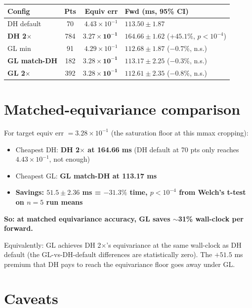 \documentclass[10pt,a4paper]{article}
\begin{document}
\begin{center}
\small
\begin{tabular}{lcrl}
\toprule
Config & Pts & Equiv err & Fwd (ms, 95\% CI) \\
\midrule
DH default                   & 70  & $4.43\!\times\!10^{-1}$ & $113.50 \pm 1.87$ \\
\textbf{DH 2$\times$}        & 784 & $\mathbf{3.27\!\times\!10^{-1}}$ & $\mathbf{164.66 \pm 1.62}$ ($+45.1\%$, $p<10^{-4}$) \\
GL min                       & 91  & $4.29\!\times\!10^{-1}$ & $112.68 \pm 1.87$ ($-0.7\%$, n.s.) \\
\textbf{GL match-DH}         & 182 & $\mathbf{3.28\!\times\!10^{-1}}$ & $\mathbf{113.17 \pm 2.25}$ ($-0.3\%$, n.s.) \\
\textbf{GL 2$\times$}        & 392 & $\mathbf{3.28\!\times\!10^{-1}}$ & $\mathbf{112.61 \pm 2.35}$ ($-0.8\%$, n.s.) \\
\bottomrule
\end{tabular}
\end{center}

\section*{Matched-equivariance comparison}

For target equiv err $= 3.28 \times 10^{-1}$ (the saturation floor at this mmax cropping):

\begin{itemize}\setlength\itemsep{0pt}
\item Cheapest DH: \textbf{DH 2$\times$ at 164.66 ms}
  (DH default at 70 pts only reaches $4.43\!\times\!10^{-1}$, not enough)
\item Cheapest GL: \textbf{GL match-DH at 113.17 ms}
\item \textbf{Savings: $51.5 \pm 2.36$ ms = $-31.3\%$ time, $p < 10^{-4}$ from
  Welch's t-test on $n=5$ run means}
\end{itemize}

\textbf{So: at matched equivariance accuracy, GL saves $\sim$31\% wall-clock per
forward.}

Equivalently: GL achieves DH 2$\times$'s equivariance at the same wall-clock
as DH default (the GL-vs-DH-default differences are statistically zero).
The $+51.5$ ms premium that DH pays to reach the equivariance floor goes
away under GL.

\section*{Caveats}
\end{document}

